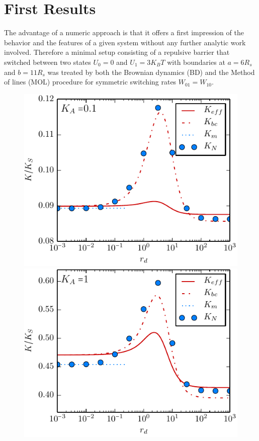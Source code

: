 \section{First Results}
The advantage of a numeric approach is that it offers a first impression of the behavior and the features of a given system without any further analytic work involved. Therefore a minimal setup consisting of a repulsive barrier that switched between two states $U_0 = 0$ and $U_1 = 3 K_B T$ with boundaries at $a = 6 R_s$ and $b = 11 R_s$ was treated by both the Brownian dynamics (BD) and the Method of lines (MOL) procedure for symmetric switching rates $W_{01} = W_{10}$. \\
\begin{minipage}[t]{.63 \textwidth}
     \begin{figure}[H]
        \hspace{-1cm } \includegraphics[width = 1 \textwidth]{plots/rep_rate_comparison0.pdf} \\
        \hspace{-1cm } \includegraphics[width = 1 \textwidth]{plots/rep_rate_comparison1.pdf} \\

\end{figure}
\end{minipage}
